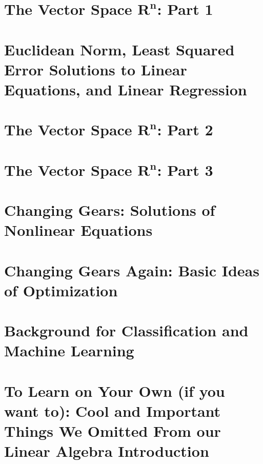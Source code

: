 \documentclass[letterpaper]{book}
\begin{document}
\chapter{The Vector Space $\mathbf{R^n}$: Part 1}
\label{chap:Chap07VectorSpaceRnPart1}


\chapter{Euclidean Norm, Least Squared Error Solutions to Linear Equations, and Linear Regression}
\label{chap:NormRegression}


\chapter{The Vector Space  $\mathbf{R^n}$: Part 2}
\label{chap:Rnpart2}


\chapter{The Vector Space  $\mathbf{R^n}$: Part 3}
\label{chap:matrixFacts}


\chapter{Changing Gears: Solutions of Nonlinear Equations}
\label{chap:NonlinearEquations}


\chapter{Changing Gears Again: Basic Ideas of Optimization}
\label{chap:Optimization}



\chapter{Background for Classification and Machine Learning}
\label{chap:Background3MachineLearning}


\pagestyle{plain}

\newpage

\appendix

\chapter{To Learn on Your Own (if you want to): Cool and Important Things We Omitted From our Linear Algebra Introduction}

\end{document}
